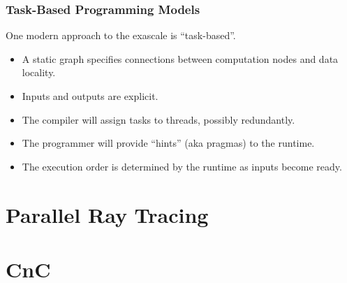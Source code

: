\documentclass{beamer}
\begin{document}
\begin{frame}
  \frametitle{Task-Based Programming Models}

  One modern approach to the exascale is ``task-based''.
  \begin{itemize}
  \item A static graph specifies connections between computation
    nodes and data locality.
  \item Inputs and outputs are explicit.
  \item The compiler will assign tasks to threads, possibly
    redundantly.
  \item The programmer will provide ``hints'' (aka pragmas) to the
    runtime.
  \item The execution order is determined by the runtime as inputs
    become ready.
  \end{itemize}
\end{frame}


\section{Parallel Ray Tracing}

\section{CnC}
\end{document}
